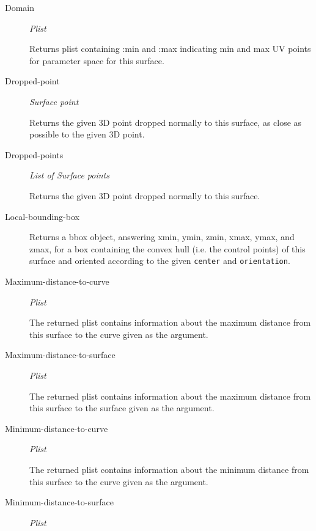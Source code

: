\documentclass [11pt]{book}
\begin{document}
\begin{itemize}
\begin{description}
\item [Domain]
\emph{Plist}

 Returns plist containing :min and :max indicating min and max UV points
for parameter space for this surface.




\item [Dropped-point]
\emph{Surface point}

 Returns the given 3D point dropped normally to this
surface, as close as possible to the given 3D point.




\item [Dropped-points]
\emph{List of Surface points}

 Returns the given 3D point dropped normally to this surface.




\item [Local-bounding-box]

Returns a bbox object, answering xmin, ymin, zmin, xmax, ymax, and zmax,
for a box containing the convex hull (i.e. the control points) of this
surface and oriented according to the given \texttt{center} and \texttt{orientation}.




\item [Maximum-distance-to-curve]
\emph{Plist}

 The returned plist contains information about the maximum
distance from this surface to the curve given as the argument.




\item [Maximum-distance-to-surface]
\emph{Plist}

 The returned plist contains information about the maximum
distance from this surface to the surface given as the argument.




\item [Minimum-distance-to-curve]
\emph{Plist}

 The returned plist contains information about the minimum
distance from this surface to the curve given as the argument.




\item [Minimum-distance-to-surface]
\emph{Plist}


\end{description}
\end{itemize}
\end{document}
